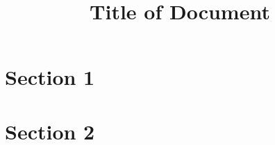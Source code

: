 \documentclass{article}
\title{Title of Document}
\author{}
\date{}
\begin{document}
\maketitle

\section{Section 1}
\lipsum[1]

\section{Section 2}
\lipsum[2]
\end{document}
